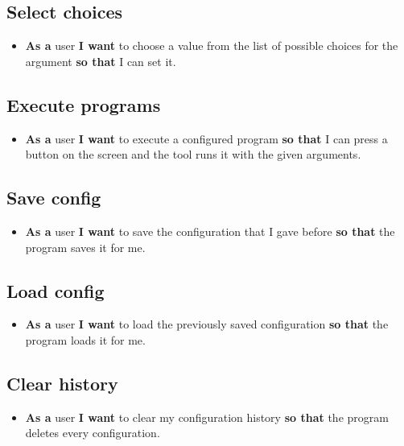 \documentclass{article}
\begin{document}
\subsection{Select choices}
\begin{itemize}
    \item \textbf{As a} user \textbf{I want} to choose a value from the list of possible choices for the argument \textbf{so that} I can set it.
\end{itemize}

\subsection{Execute programs}
\begin{itemize}
    \item \textbf{As a} user \textbf{I want} to execute a configured program \textbf{so that} I can press a button on the screen and the tool runs it with the given arguments.
\end{itemize}

\subsection{Save config}
\begin{itemize}
    \item \textbf{As a} user \textbf{I want} to save the configuration that I gave before \textbf{so that} the program saves it for me.
\end{itemize}

\subsection{Load config}
\begin{itemize}
    \item \textbf{As a} user \textbf{I want} to load the previously saved configuration \textbf{so that} the program loads it for me.
\end{itemize}

\subsection{Clear history}
\begin{itemize}
    \item \textbf{As a} user \textbf{I want} to clear my configuration history \textbf{so that} the program deletes every configuration.
\end{itemize}
\end{document}
